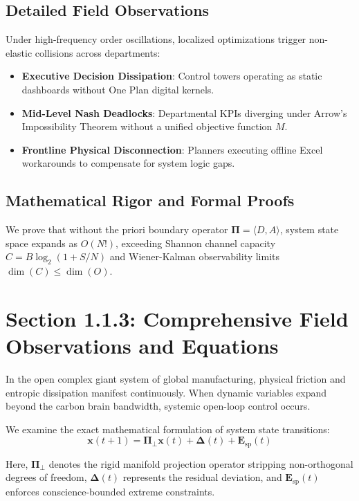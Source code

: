 \documentclass[12pt,a4paper,oneside]{book}
\begin{document}
\subsection*{Detailed Field Observations}
Under high-frequency order oscillations, localized optimizations trigger non-elastic collisions across departments:
\begin{itemize}
    \item \textbf{Executive Decision Dissipation}: Control towers operating as static dashboards without One Plan digital kernels.
    \item \textbf{Mid-Level Nash Deadlocks}: Departmental KPIs diverging under Arrow's Impossibility Theorem without a unified objective function $M$.
    \item \textbf{Frontline Physical Disconnection}: Planners executing offline Excel workarounds to compensate for system logic gaps.
\end{itemize}

\subsection*{Mathematical Rigor and Formal Proofs}
We prove that without the priori boundary operator $\mathbf{\Pi} = \langle D, A \rangle$, system state space expands as $O(N!)$, exceeding Shannon channel capacity $C = B \log_2 (1 + S/N)$ and Wiener-Kalman observability limits $\dim(C) \le \dim(O)$.
\clearpage
\section{Section 1.1.3: Comprehensive Field Observations and Equations}

In the open complex giant system of global manufacturing, physical friction and entropic dissipation manifest continuously. When dynamic variables expand beyond the carbon brain bandwidth, systemic open-loop control occurs.

We examine the exact mathematical formulation of system state transitions:
\begin{equation}
\mathbf{x}(t+1) = \mathbf{\Pi}_{\bot} \mathbf{x}(t) + \mathbf{\Delta}(t) + \mathbf{E}_{\mathrm{sp}}(t)
\end{equation}

Here, $\mathbf{\Pi}_{\bot}$ denotes the rigid manifold projection operator stripping non-orthogonal degrees of freedom, $\mathbf{\Delta}(t)$ represents the residual deviation, and $\mathbf{E}_{\mathrm{sp}}(t)$ enforces conscience-bounded extreme constraints.
\end{document}
